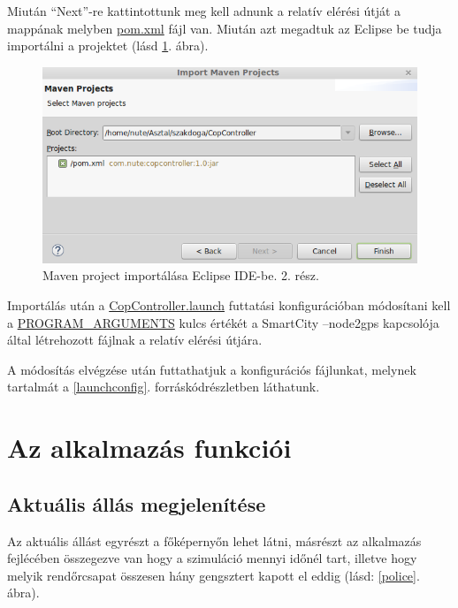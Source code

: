 \documentclass[a4paper,12pt]{report}
\begin{document}
\vspace{2mm}
Miután ``Next''-re kattintottunk meg kell adnunk a relatív elérési útját a mappának melyben \url{pom.xml} fájl van. Miután azt megadtuk az Eclipse be tudja importálni a projektet (lásd \ref{importmaven2}. ábra).

\begin{figure}[ht]
\centerline{
\includegraphics[width=6in]{img/importmavenproject2}}
\caption{Maven project importálása Eclipse IDE-be. 2. rész.}
\label{importmaven2}
\end{figure}

Importálás után a \url{CopController.launch} futtatási konfigurációban módosítani kell a \url{PROGRAM_ARGUMENTS} kulcs értékét a SmartCity --node2gps kapcsolója által létrehozott fájlnak a relatív elérési útjára.

\vspace{2mm}
A módosítás elvégzése után futtathatjuk a konfigurációs fájlunkat, melynek tartalmát a \ref{launchconfig}. forráskódrészletben láthatunk.



\section{Az alkalmazás funkciói}
\label{functions}

\subsection{Aktuális állás megjelenítése}
\label{actualstate}

Az aktuális állást egyrészt a főképernyőn lehet látni, másrészt az alkalmazás fejlécében összegezve van hogy a szimuláció mennyi időnél tart, illetve hogy melyik rendőrcsapat összesen hány gengsztert kapott el eddig (lásd: \ref{police}. ábra).
\end{document}
